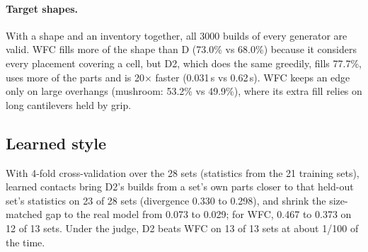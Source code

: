 \documentclass[10pt,twocolumn]{article}
\begin{document}
\paragraph{Target shapes.} With a shape and an inventory together, all 3000 builds of every generator are valid.
WFC fills more of the shape than D (73.0\% vs 68.0\%) because it considers every placement covering a cell, but D2,
which does the same greedily, fills 77.7\%, uses more of the parts and is 20$\times$ faster (0.031\,s vs 0.62\,s).
WFC keeps an edge only on large overhangs (mushroom: 53.2\% vs 49.9\%), where its extra fill relies on long
cantilevers held by grip.

\subsection{Learned style}
With 4-fold cross-validation over the 28 sets (statistics from the 21 training sets), learned contacts bring D2's
builds from a set's own parts closer to that held-out set's statistics on 23 of 28 sets (divergence 0.330 to 0.298),
and shrink the size-matched gap to the real model from 0.073 to 0.029; for WFC, 0.467 to 0.373 on 12 of 13 sets.
Under the judge, D2 beats WFC on 13 of 13 sets at about 1/100 of the time.
\end{document}
